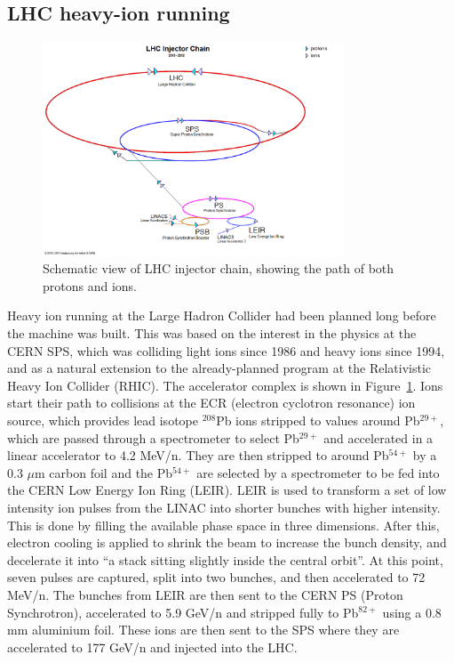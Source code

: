 \subsection{LHC heavy-ion running}
\label{subsecall:running}

\begin{figure}[!htb]
\begin{center}
\includegraphics[width=0.8\textwidth]{introduction_figs/LHC_chain.png}
\caption[]{Schematic view of LHC injector chain, showing the path of both protons and ions.}
\label{fig:pas:intro:lhc}
\end{center}
\end{figure}

Heavy ion running at the Large Hadron Collider had been planned long before the machine was built.
This was based on the interest in the physics at the CERN SPS, which was colliding light ions since
1986 and heavy ions since 1994, and as a natural extension to the already-planned program
at the Relativistic Heavy Ion Collider (RHIC).
The accelerator complex is shown in Figure~\ref{fig:pas:intro:lhc}.
Ions start their path to collisions at the ECR (electron cyclotron resonance) ion source,
which provides lead isotope $^{208}$Pb ions stripped to values around Pb$^{29+}$, which are passed through
a spectrometer to select Pb$^{29+}$ and accelerated in a linear accelerator to 4.2 MeV/n.
They are then stripped to around Pb$^{54+}$ by a 0.3 $\mu$m carbon foil and the
Pb$^{54+}$ are selected by a spectrometer to be fed into the CERN Low Energy Ion Ring (LEIR).
LEIR is used to transform a set of low intensity ion pulses from the LINAC into shorter
bunches with higher intensity.  This is done by filling the available phase space in
three dimensions.  After this, electron cooling is applied to shrink the beam to increase the
bunch density, and decelerate it into ``a stack sitting slightly inside the central orbit''.
At this point, seven pulses are captured, split into two bunches, and then accelerated to
72 MeV/n.
The bunches from LEIR are then sent to the CERN PS (Proton Synchrotron), accelerated to
5.9 GeV/n and stripped fully to Pb$^{82+}$ using a 0.8 mm aluminium foil.  These ions
are then sent to the SPS where they are accelerated to 177 GeV/n and injected into the LHC.


